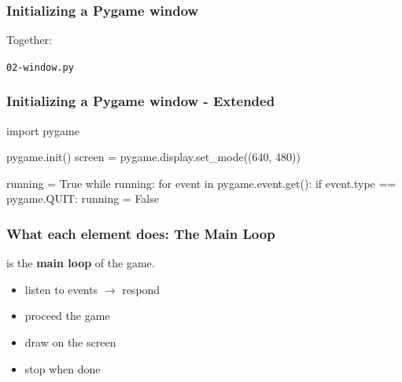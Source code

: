 \documentclass[handout]{beamer}   %
\begin{document}


\begin{frame}
\frametitle{Initializing a Pygame window}
Together:
\medskip
\initWindow
\pause
\bigskip

\textcolor{tg}{\texttt{02-window.py}}

\end{frame}




\begin{frame}[fragile]
\frametitle{Initializing a Pygame window - Extended}
\begin{pythoncode}
               	
    import pygame

    pygame.init()
    screen = pygame.display.set_mode((640, 480))

    running = True
    while running:
        for event in pygame.event.get():
            if event.type == pygame.QUIT:
                running = False
        
\end{pythoncode}        
\end{frame}

\begin{frame}
\frametitle{What each element does: The Main Loop}

\mainLoop
  
\medskip

is the \textbf{main loop} of the game.
\pause
\begin{itemize}
\item listen to events $\rightarrow$ respond
\pause
\item proceed the game
\pause
\item draw on the screen
\pause
\item stop when done
\end{itemize}
\end{frame}
\end{document}
